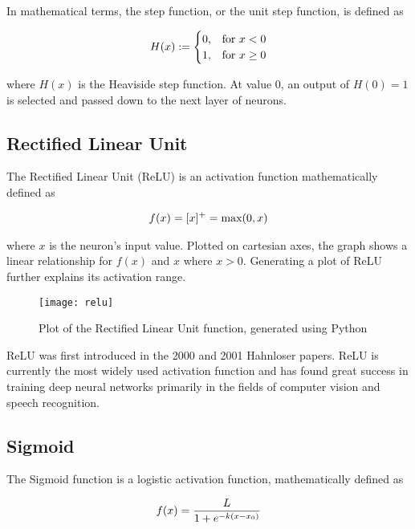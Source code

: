 In mathematical terms, the step function, or the unit step function, is defined as

\begin{align}
    \centering
    H(x) := \begin{cases}
        0, & \text{for } x < 0 \\
        1, & \text{for } x \geq 0
    \end{cases}
\end{align}

where $H(x)$ is the Heaviside step function. At value 0, an output of $H(0) = 1$ is selected and passed down to the next layer of neurons.

\subsection{Rectified Linear Unit}
The Rectified Linear Unit (ReLU) is an activation function mathematically defined as 

\begin{align}
    \centering
    f(x) = [x]^+ = \text{max}(0, x) 
\end{align}

where $x$ is the neuron's input value. Plotted on cartesian axes, the graph shows a linear relationship for $f(x)$ and $x$ where $x > 0$. Generating a plot of ReLU further explains its activation range.

\begin{figure}[H]
    \centering
    \texttt{[image: relu]}
    \caption{Plot of the Rectified Linear Unit function, generated using Python}
    \label{tab:relu}
\end{figure}

ReLU was first introduced in the 2000 and 2001 Hahnloser papers. ReLU is currently the most widely used activation function and has found great success in training deep neural networks primarily in the fields of computer vision and speech recognition.

\subsection{Sigmoid}
The Sigmoid function is a logistic activation function, mathematically defined as 

\begin{align}
    \centering
    f(x) = \frac{L}{1 + e^{-k(x-x_0)}}
\end{align}

